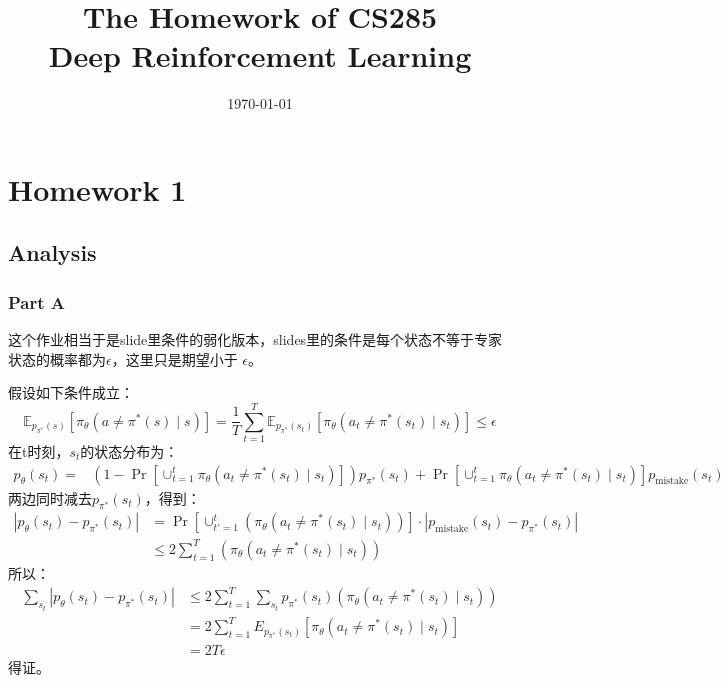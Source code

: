 \documentclass[12pt,oneside]{book}
\title{The Homework of CS285\\
\large Deep Reinforcement Learning}
\author{\Name}
\date{\today}
\begin{document}
\sloppy
\maketitle
{}
\tableofcontents
\setcounter{tocdepth}{2}
\mainmatter
\newpage
{}

\chapter{Homework 1}

\section{Analysis}

\subsection{Part A}

这个作业相当于是slide里条件的弱化版本，slides里的条件是每个状态不等于专家状态的概率都为$\epsilon$，这里只是期望小于
$\epsilon$。

假设如下条件成立：
\begin{equation}
    \mathbb{E}_{p_{\pi^*}(s)} \left[\pi_{\theta}(a \ne \pi^*(s) \mid s)\right] 
    = \frac{1}{T} \sum_{t=1}^{T} \mathbb{E}_{p_{\pi^*}(s_t)} \left[\pi_{\theta}(a_t \ne \pi^*(s_t) \mid s_t)\right]
    \leq \epsilon
\end{equation}
在t时刻，$s_t$的状态分布为：
\begin{align}
    p_{\theta}(s_t) = 
    &(1 - \Pr[\cup_{t=1}^{t}\pi_{\theta}(a_t \ne \pi^*(s_t) \mid s_t)]) p_{\pi^*}(s_t) + 
    \Pr[\cup_{t=1}^{t}\pi_{\theta}(a_t \ne \pi^*(s_t) \mid s_t)] p_{\text{mistake}}(s_t)
\end{align}
两边同时减去$ p_{\pi^*}(s_t)$，得到：
\begin{align}
    |p_{\theta}(s_t) - p_{\pi^*}(s_t)| 
    &= \Pr\left[\cup_{t'=1}^{t} \left(\pi_{\theta}(a_{t} \ne \pi^*(s_{t}) \mid s_{t})\right)\right] \cdot |p_{\text{mistake}}(s_t) - p_{\pi^*}(s_t)| \nonumber \\
    &\leq 2\sum_{t=1}^{T}(\pi_{\theta}(a_{t} \ne \pi^*(s_{t}) \mid s_{t}))
\end{align}
所以：
\begin{align}
    \sum_{s_t}|p_{\theta}(s_t) - p_{\pi^*}(s_t)| 
    &\leq 2\sum_{t=1}^{T}\sum_{s_t}p_{\pi^*}(s_t)(\pi_{\theta}(a_{t} \ne \pi^*(s_{t}) \mid s_{t})) \nonumber \\
    &= 2\sum_{t=1}^{T}E_{p_{\pi^*}(s_t)}[\pi_{\theta}(a_{t} \ne \pi^*(s_{t}) \mid s_{t})] \nonumber \\
    &= 2T\epsilon
\end{align}
得证。
\end{document}
